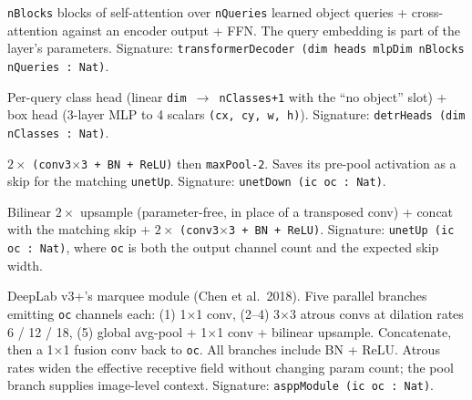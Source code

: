 \begin{definition}
  \label{layer:transformerDecoder}
  \leanok
  \texttt{nBlocks} blocks of self-attention over
  \texttt{nQueries} learned object queries + cross-attention against an
  encoder output + FFN. The query embedding is part of the layer's
  parameters. Signature:
  \texttt{transformerDecoder (dim heads mlpDim nBlocks nQueries : Nat)}.
\end{definition}

\begin{definition}
  \label{layer:detrHeads}
  \leanok
  Per-query class head (linear \texttt{dim $\to$ nClasses+1} with the
  ``no object'' slot) + box head (3-layer MLP to 4 scalars
  \texttt{(cx, cy, w, h)}). Signature: \texttt{detrHeads (dim nClasses : Nat)}.
\end{definition}

\begin{definition}
  \label{layer:unetDown}
  \leanok
  $2 \times$ \texttt{(conv3$\times$3 + BN + ReLU)} then \texttt{maxPool-2}.
  Saves its pre-pool activation as a skip for the matching
  \texttt{unetUp}. Signature: \texttt{unetDown (ic oc : Nat)}.
\end{definition}

\begin{definition}
  \label{layer:unetUp}
  \leanok
  Bilinear $2\times$ upsample (parameter-free, in place of a transposed
  conv) + concat with the matching skip +
  $2 \times$ \texttt{(conv3$\times$3 + BN + ReLU)}. Signature:
  \texttt{unetUp (ic oc : Nat)}, where \texttt{oc} is both the output
  channel count and the expected skip width.
\end{definition}

\begin{definition}
  \label{layer:asppModule}
  \leanok
  DeepLab v3+'s marquee module (Chen et al.\ 2018). Five parallel
  branches emitting \texttt{oc} channels each: (1) 1$\times$1 conv, (2--4)
  3$\times$3 atrous convs at dilation rates 6 / 12 / 18, (5) global avg-pool
  + 1$\times$1 conv + bilinear upsample. Concatenate, then a 1$\times$1
  fusion conv back to \texttt{oc}. All branches include BN + ReLU.
  Atrous rates widen the effective receptive field without changing
  param count; the pool branch supplies image-level context. Signature:
  \texttt{asppModule (ic oc : Nat)}.
\end{definition}


